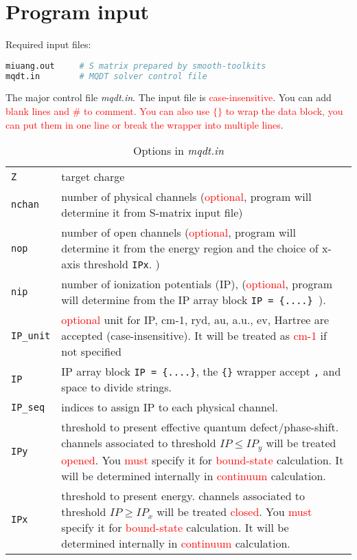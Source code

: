 \documentclass[11pt]{article}
\begin{document}
\section{\label{sec:input}Program input}
Required input files:
\begin{lstlisting}[language=bash]
miuang.out     # S matrix prepared by smooth-toolkits
mqdt.in        # MQDT solver control file                             
\end{lstlisting}

The major control file \emph{mqdt.in}. The input file is \textcolor{red}{case-insensitive}. You can add  \textcolor{red}{blank lines and $\#$ to comment. You can also use $\{\}$ to wrap the data block, you can put them in one line or break the wrapper into multiple lines}.

\begin{table}[]
	\caption{Options in \emph{mqdt.in}}
	\label{table:mqdt.in}
	\begin{tabular}{|p{5cm}|p{10.5cm}|}
		\hline
		\verb|Z| & target charge \\
		\verb|nchan|& number of physical channels (\textcolor{red}{optional}, program will determine it from S-matrix input file) \\
		\verb|nop|& number of open channels (\textcolor{red}{optional}, program will determine it from the energy region and the choice of x-axis threshold \verb|IPx|. )\\
		\verb|nip|& number of ionization potentials (IP), (\textcolor{red}{optional}, program will determine from the IP array block \verb|IP = {....} |).\\
		\verb|IP_unit|& \textcolor{red}{optional} unit for IP, cm-1, ryd, au, a.u., ev, Hartree are accepted (case-insensitive). It will be treated as \textcolor{red}{cm-1} if not specified\\
		\verb|IP|& IP array block \verb|IP = {....}|, the \verb|{}| wrapper accept \verb|,| and space to divide strings. \\
		\verb|IP_seq|& indices to assign IP to each physical channel.\\
		
		\verb|IPy|& threshold to present effective quantum defect/phase-shift. channels associated to threshold $IP \leq IP_y$ will be treated \textcolor{red}{opened}. You \textcolor{red}{must} specify it for \textcolor{red}{bound-state} calculation. It will be determined internally in \textcolor{red}{continuum} calculation.\\
		\verb|IPx|& threshold to present energy. channels associated to threshold $IP \geq IP_x$ will be treated \textcolor{red}{closed}. You \textcolor{red}{must} specify it for \textcolor{red}{bound-state} calculation. It will be determined internally in \textcolor{red}{continuum} calculation.\\
		

\end{tabular}
\end{table}
\end{document}
